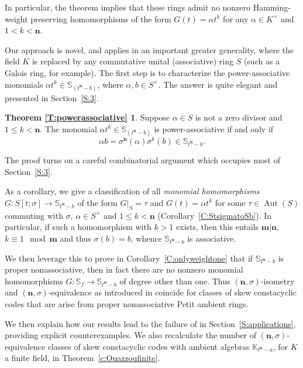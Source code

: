 \documentclass[11pt]{amsart}
\theoremstyle{plain}
\theoremstyle{definition}
\numberwithin{equation}{section}
\numberwithin{figure}{section}
\newcommand{\Sone}[1]{\Stsigma/\Stsigma (t^{\de}-#1)} %
\newcommand{\ring}{S}
\newcommand{\field}{K}
\newcommand{\Stsigma}{S[t;\sigma]}
\newcommand{\Konenew}[1]{\mathbb{K}_{t^\de-#1}}
\newcommand{\os}{\mathbf{m}}  %
\newcommand{\de}{\mathbf{n}}  %
\DeclareMathOperator{\Aut}{Aut}
\begin{document}
In particular, the theorem implies that these rings admit no nonzero Hamming-weight preserving homomorphisms
of the form $G(t)=\alpha t^k$ for any $\alpha\in \field^\times$ and $1<k<\de$.

Our approach is novel, and applies in an  important greater generality, where the field $K$ is replaced by any commutative unital (associative) ring $\ring$ (such as a Galois ring, for example).  The first step is to characterize the power-associative monomials $\alpha t^k \in \mathbb{S}_{(t^\de-b)}$, 
where $\alpha,b \in \ring^\times$. The answer is quite elegant and presented in Section~\ref{S:3}.
\newtheorem*{T:power}{Theorem \ref{T:powerassociative}}
\begin{T:power}
    Suppose $\alpha \in \ring$ is not a zero divisor and $1\leq k < \de$.  The monomial $\alpha t^k \in \mathbb{S}_{(t^\de-b)}$ %
    is power-associative if and only if
    \begin{equation}\label{E:introassoc}
    \alpha b = \sigma^{\de}(\alpha)\sigma^k(b) \in\mathbb{S}_{t^\de-b}.
    \end{equation}
\end{T:power}


The proof turns on a careful combinatorial argument which occupies most of Section~\ref{S:3}.

As a corollary, we give a classification of all \emph{monomial homomorphisms} $G:\Stsigma\to \mathbb{S}_{t^\de-b} $ %
of the form $G|_S=\tau$ and $G(t)=\alpha t^k$ for some $\tau\in \Aut(S)$ commuting with $\sigma$, $\alpha\in S^\times$ and $1\leq k <\de$ 
(Corollary~\ref{C:StsigmatoSb}).
In particular, if such a homomorphism with $k>1$ exists,
then this entails $\os|\de$, $k\equiv 1 \mod \os$ and thus $\sigma(b)=b$, whence $\mathbb{S}_{t^\de-b}$ 
is associative.

 We then leverage this to prove in Corollary~\ref{C:onlyweightone} that if $\mathbb{S}_{t^\de-b}$ 
 is proper nonassociative, then in fact there are no nonzero monomial homomorphisms $G:\mathbb{S}_{f}\to \mathbb{S}_{t^\de-b} 
 $ of degree other than one. Thus  $(\de,\sigma)$-isometry and $(\de,\sigma)$-equivalence as introduced in \cite{OuazzouNajmeddineAydin2025} coincide for  classes of skew constacyclic codes that are arise from proper nonassociative Petit ambient rings.



We then explain how our results lead to the failure of \cite[Theorem 4]{OuazzouNajmeddineAydin2025}  in Section~\ref{S:applications}, providing explicit counterexamples.  We also recalculate the number of $(\de,\sigma)$-equivalence classes of skew constacyclic codes with ambient algebras $\Konenew{a}$, for $\field$  a finite field, in Theorem~\ref{c:Ouazzoufinite}.
\end{document}
